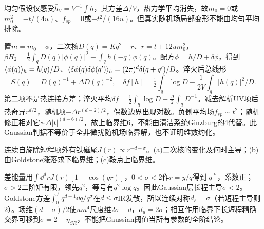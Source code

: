 \begin{solution}
均匀假设仅感受$\bar h_V=V^{-1}\int h$，其方差$\Delta/V$，热力学平均消失，故$m_0=0$或$m_0^2=-t/(4u)$、$f_{sp}=0$或$-t^2/(16u)$。但真实随机场局部变形不能由均匀平均排除。

置$m=m_0+\phi$，二次核$D(q)=Kq^2+r$、$r=t+12um_0^2$，$\beta H_2=\tfrac12\int_qD(q)|\phi(q)|^2-\int_q h(-q)\phi(q)$。配方$\phi=h/D+\delta\phi$，得到$\langle \phi(q)\rangle_h=h(q)/D$、$\langle \delta\phi(q)\delta\phi(q')\rangle_h=(2\pi)^d\delta(q+q')/D$。淬火后总线形
\begin{equation}
S(q)=D(q)^{-1}+\Delta D(q)^{-2},\quad
\delta f[h]=\tfrac12\int_q\log D-\frac1{2V}\int_q|h(q)|^2/D.
\end{equation}
第二项不是热连接方差；淬火平均$\overline{\delta f}=\tfrac12\int_q\log D-\tfrac\Delta2\int_qD^{-1}$。减去解析UV项后热奇异$r^{d/2}$，随机项$-\Delta r^{(d-2)/2}$，偶数边界出现对数。负側平均场$f_{sp}\sim t^2$；随机修正相对它$\sim\Delta |t|^{(d-6)/2}$，故上临界维6，不能由清洁系统Ginzburg的4代替。此Gaussian判据不等价于全非微扰随机场临界解，也不证明维数约化。
\end{solution}
\begin{exercise}[原题3(a)--(c)]\label{p:334-2-3}
连续自旋除短程项外有铁磁尾$J(r)\propto r^{-d-\sigma}$。(a)二次核的变化及何时主导；(b)由Goldstone涨落求下临界维；(c)鞍点上临界维。
\end{exercise}
\begin{solution}
差能量用$\int\dd^drJ(r)[1-\cos(qr)]$，$0<\sigma<2$作$r=y/q$得到$|q|^\sigma$，系数正；$\sigma>2$二阶矩有限，领先$q^2$，等号有$q^2\log q$。因此Gaussian层长程主导$\sigma<2$。Goldstone方差$\int_0^\Lambda q^{d-1}\dd q/q^\sigma$在$d\le\sigma$IR发散，所以连续对称$d_\ell=\sigma$（若短程主导则2）。场维$(d-\sigma)/2$使$um^4$尺度维$2\sigma-d$，$d_u=2\sigma$；相互作用临界下长短程精确交界可移到$\sigma=2-\eta_{SR}$，不能把Gaussian阈值当所有参数的全阶结论。
\end{solution}
